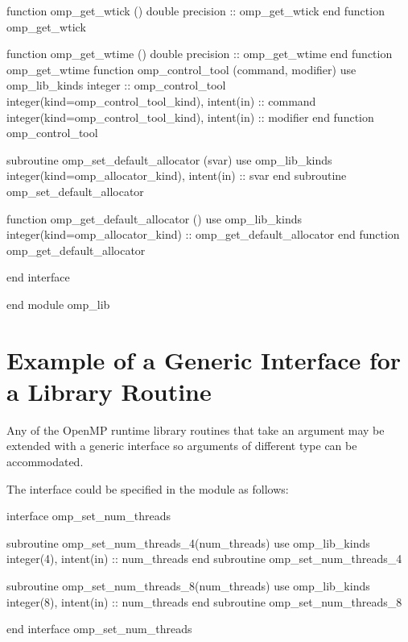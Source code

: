 {\begin{ompfFunction}
          function omp_get_wtick ()
           double precision :: omp_get_wtick
          end function omp_get_wtick

          function omp_get_wtime ()
           double precision :: omp_get_wtime
          end function omp_get_wtime
          function omp_control_tool (command, modifier)
           use omp_lib_kinds
           integer :: omp_control_tool
           integer(kind=omp_control_tool_kind), intent(in) :: command
           integer(kind=omp_control_tool_kind), intent(in) :: modifier
          end function omp_control_tool

          subroutine omp_set_default_allocator (svar)
           use omp_lib_kinds
           integer(kind=omp_allocator_kind), intent(in) :: svar
          end subroutine omp_set_default_allocator

          function omp_get_default_allocator ()
           use omp_lib_kinds
           integer(kind=omp_allocator_kind) :: omp_get_default_allocator
          end function omp_get_default_allocator

          end interface

        end module omp_lib
\end{ompfFunction}} %






\section{Example of a Generic Interface for a Library Routine}
\label{sec:Example of a Generic Interface for a Library Routine}
Any of the OpenMP runtime library routines that take an argument may be extended
with a generic interface so arguments of different  type can be accommodated.

The  interface could be specified in the  module
as follows:

\begin{ompfSubroutine}
interface omp_set_num_threads

    subroutine omp_set_num_threads_4(num_threads)
      use omp_lib_kinds
      integer(4), intent(in) :: num_threads
    end subroutine omp_set_num_threads_4

    subroutine omp_set_num_threads_8(num_threads)
      use omp_lib_kinds
      integer(8), intent(in) :: num_threads
    end subroutine omp_set_num_threads_8

end interface omp_set_num_threads
\end{ompfSubroutine}


